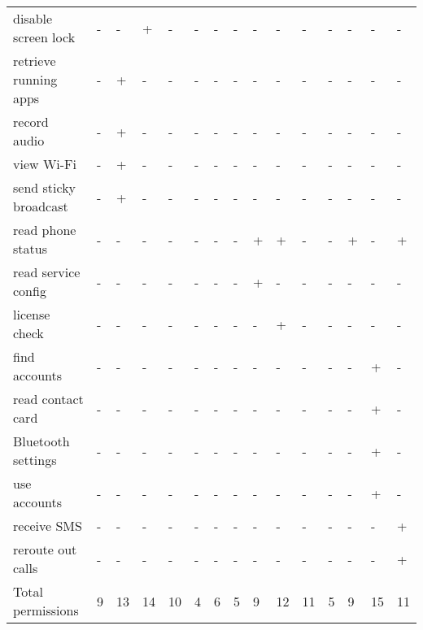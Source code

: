 \begin{table*}
\begin{tabular}{ | l | l l l l l l l | l l l l l l l |}
		disable screen lock & - & - & + & - & - & - & - & - & - & - & - & - & - & - \\
		retrieve running apps & - & + & - & - & - & - & - & - & - & - & - & - & - & - \\
		record audio & - & + & - & - & - & - & - & - & - & - & - & - & - & - \\
		view Wi-Fi & - & + & - & - & - & - & - & - & - & - & - & - & - & - \\
		send sticky broadcast & - & + & - & - & - & - & - & - & - & - & - & - & - & - \\
		read phone status & - & - & - & - & - & - & - & + & + & - & - & + & - & + \\
		read service config & - & - & - & - & - & - & - & + & - & - & - & - & - & - \\
		license check & - & - & - & - & - & - & - & - & + & - & - & - & - & - \\
		find accounts & - & - & - & - & - & - & - & - & - & - & - & - & + & - \\
		read contact card & - & - & - & - & - & - & - & - & - & - & - & - & + & - \\
		Bluetooth settings & - & - & - & - & - & - & - & - & - & - & - & - & + & - \\
		use accounts & - & - & - & - & - & - & - & - & - & - & - & - & + & - \\
		receive SMS & - & - & - & - & - & - & - & - & - & - & - & - & - & + \\
		reroute out calls & - & - & - & - & - & - & - & - & - & - & - & - & - & + \\
		\hline
		Total permissions & 9 & 13 & 14 & 10 & 4 & 6 & 5 & 9 & 12 & 11 & 5 & 9 & 15 & 11 \\
		\hline
	\end{tabular}
	\label{tab:permissions}
\end{table*}

